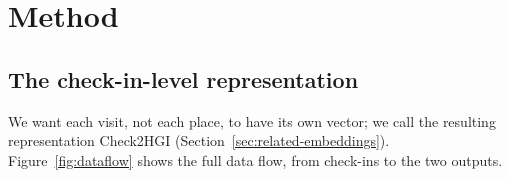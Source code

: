 \section{Method}
\label{sec:method}

\subsection{The check-in-level representation}
\label{sec:method-rep}

We want each visit, not each place, to have its own vector; we call the resulting representation Check2HGI (Section~\ref{sec:related-embeddings}).
Figure~\ref{fig:dataflow} shows the full data flow, from check-ins to the two outputs.

